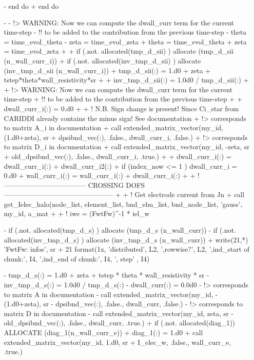 -    end do
+      end do
 
-    
-    !> WARNING: Now we can compute the dwall_curr term for the current time-step
-    !!          to be added to the contribution from the previous time-step
-    theta = time_evol_theta
-    zeta  = time_evol_zeta
+      theta = time_evol_theta
+      zeta  = time_evol_zeta
+
+      if  (.not. allocated(tmp_d_sii)     ) allocate (tmp_d_sii     (n_wall_curr_i))
+      if  (.not. allocated(inv_tmp_d_sii) ) allocate (inv_tmp_d_sii (n_wall_curr_i))
+      tmp_d_sii(:) = 1.d0 + zeta + tstep*theta*wall_resistivity*sr%
+
+      inv_tmp_d_sii(:) = 1.0d0 / tmp_d_sii(:)
+
+      !> WARNING: Now we can compute the dwall_curr term for the current time-step
+      !!          to be added to the contribution from the previous time-step
+
+      dwall_curr_i(:) = 0.d0
+
+      ! N.B. Sign change is present! Since Ci_star from CARIDDI already contains the minus sign! See documentation
+      !> corresponds to matrix A_i in documentation
+      call extended_matrix_vector(my_id, (1.d0+zeta), sr%
+                                dpsibnd_vec(:), .false., dwall_curr_i, .false.) 
+      !> corresponds to matrix D_i in documentation
+      call extended_matrix_vector(my_id, -zeta, sr%
+                                old_dpsibnd_vec(:), .false., dwall_curr_i, .true.) 
+       
+      dwall_curr_i(:) = dwall_curr_i(:) + dwall_curr_i2(:)
+      if (index_now <= 1 ) dwall_curr_i = 0.d0
+      wall_curr_i(:) = wall_curr_i(:) + dwall_curr_i(:) 
+
+      ! ------------------------------------  CROSSING DOFS ------------------------------------------------
+
+      ! Get electrode current from Jn
+      call get_Ielec_halo(node_list, element_list, bnd_elm_list, bnd_node_list, 'gauss', my_id, a_mat%
+
+      ! iwe = (FwtFw)^-1 * iel_w
 
-    if  (.not. allocated(tmp_d_s)     ) allocate (tmp_d_s     (n_wall_curr))
-    if  (.not. allocated(inv_tmp_d_s) ) allocate (inv_tmp_d_s (n_wall_curr))
+      write(21,*) 'FwtFw: infos', sr%
+      21 format(1x, 'distributed', L2, ',rowwise?', L2, ',ind_start of chunk:', I4, ',ind_end of chunk:', I4, ', step' , I4)
 
-    tmp_d_s(:) = 1.d0 + zeta + tstep * theta * wall_resistivity * sr%
-    inv_tmp_d_s(:) = 1.0d0 / tmp_d_s(:)
-    dwall_curr(:) = 0.0d0
-    !> corresponds to matrix A in documentation
-    call extended_matrix_vector(my_id, -(1.d0+zeta), sr%
-                                dpsibnd_vec(:), .false., dwall_curr, .false.)
-    !> corresponds to matrix D in documentation
-    call extended_matrix_vector(my_id, zeta, sr%
-                                old_dpsibnd_vec(:), .false., dwall_curr, .true.)
+      if (.not. allocated(diag_1)) ALLOCATE (diag_1(n_wall_curr_e))
+      diag_1(:) = 1.d0
+      call extended_matrix_vector(my_id, 1.d0, sr%
+                                  I_elec_w, .false., wall_curr_e, .true.)
 
